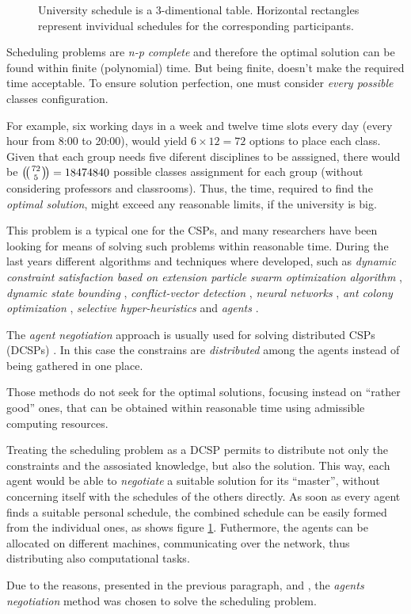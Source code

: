 \begin{figure}
  
  \caption{University schedule is a 3-dimentional table. Horizontal rectangles
           represent invividual schedules for the corresponding participants.
          }
  \label{fig:ScheduleSpace}
\end{figure}


Scheduling problems are \emph{n-p complete} \cite{ULLMAN1975384}
and therefore the optimal solution can be found within finite (polynomial) time.
But being finite, doesn't make the required time acceptable.
To ensure solution perfection, one must consider \emph{every possible} classes
configuration.

For example, six working days in a week and twelve time slots every day
(every hour from 8:00 to 20:00), would yield $6 \times 12 = 72$ options
to place each class.
Given that each group needs five diferent disciplines to be asssigned,
there would be  $\multibinom{72}{5} = 18474840$ possible classes assignment for
each group (without considering professors and classrooms).
Thus, the time, required to find the \emph{optimal solution}, might exceed any
reasonable limits, if the university is big.

This problem is a typical one for the CSPs, and many researchers have
been looking for means of solving such problems within reasonable time.
During the last years different algorithms and techniques where developed,
such as
\emph{dynamic constraint satisfaction based on extension particle swarm
      optimization algorithm} \cite{CSPswarm},
\emph{dynamic state bounding} \cite{CSPdynStateBound},
\emph{conflict-vector detection} \cite{CSPtimetable},
\emph{neural networks} \cite{CSPneuro},
\emph{ant colony optimization} \cite{CSPcunningACO, CSPlimmemACO},
\emph{selective hyper-heuristics} \cite{CSPhypHeur}
and \emph{agents} \cite{CSPagent2013, CSPagent2014, DCSPagent1998}.


The \emph{agent negotiation} approach is usually used for solving distributed
CSPs (DCSPs) \cite{DCSPagent1998, DCSP2013, CSPagent2014}.
In this case the constrains are \emph{distributed} among the agents instead of
being gathered in one place.

\medskip

Those methods do not seek for the optimal solutions, focusing instead on
``rather good'' ones, that can be obtained within reasonable time using admissible
computing resources.

\medskip

Treating the scheduling problem as a DCSP permits to
distribute not only the constraints and the assosiated knowledge, but also the solution.
This way, each agent would be able to \emph{negotiate} a suitable solution for its
``master'', without concerning itself with the schedules of the others directly.
As soon as every agent finds a suitable personal schedule, the
combined schedule can be easily formed from the individual ones, as shows
figure \ref{fig:ScheduleSpace}. Futhermore, the agents can be allocated on
different machines, communicating over the network, thus distributing also
computational tasks.

\medskip
Due to the reasons, presented in the previous paragraph, and , the \emph{agents negotiation} method
was chosen to solve the scheduling problem.
